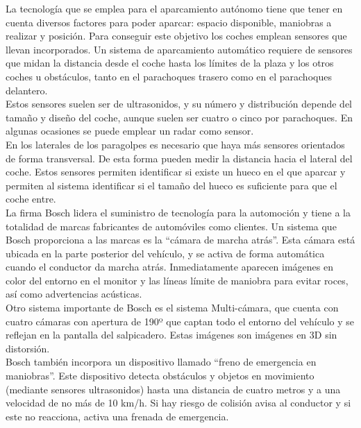La tecnología que se emplea para el aparcamiento autónomo tiene que tener en cuenta diversos factores para poder aparcar: espacio disponible, maniobras a realizar y posición. Para conseguir este objetivo los coches emplean sensores que llevan incorporados. Un sistema de aparcamiento automático requiere de sensores que midan la distancia desde el coche hasta los límites de la plaza y los otros coches u obstáculos, tanto en el parachoques trasero como en el parachoques delantero.\\

Estos sensores suelen ser de ultrasonidos, y su número y distribución depende del tamaño y diseño del coche, aunque suelen ser cuatro o cinco por parachoques. En algunas ocasiones se puede emplear un radar como sensor.\\

En los laterales de los paragolpes es necesario que haya más sensores orientados de forma transversal. De esta forma pueden medir la distancia hacia el lateral del coche. Estos sensores permiten identificar si existe un hueco en el que aparcar y permiten al sistema identificar si el tamaño del hueco es suficiente para que el coche entre.\\

La firma Bosch lidera el suministro de tecnología para la automoción y tiene a la totalidad de marcas fabricantes de automóviles como clientes. Un sistema que Bosch proporciona a las marcas es la ``cámara de marcha atrás''. Esta cámara está ubicada en la parte posterior del vehículo, y se activa de forma automática cuando el conductor da marcha atrás. Inmediatamente aparecen imágenes en color del entorno en el monitor y las líneas límite de maniobra para evitar roces, así como advertencias acústicas.\\

Otro sistema importante de Bosch es el sistema Multi-cámara, que cuenta con cuatro cámaras con apertura de 190º que captan todo el entorno del vehículo y se reflejan en la pantalla del salpicadero. Estas imágenes son imágenes en 3D sin distorsión.\\

Bosch también incorpora un dispositivo llamado ``freno de emergencia en maniobras''. Este dispositivo detecta obstáculos y objetos en movimiento (mediante sensores ultrasonidos) hasta una distancia de cuatro metros y a una velocidad de no más de 10 km/h. Si hay riesgo de colisión avisa al conductor y si este no reacciona, activa una frenada de emergencia.\\

